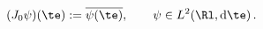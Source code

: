 \begin{equation}
  (J_0\psi)(\te) := \overline{\psi(\te)},\qquad \psi\in L^2(\Rl,\mathrm{d}\te)\,.
\end{equation}

